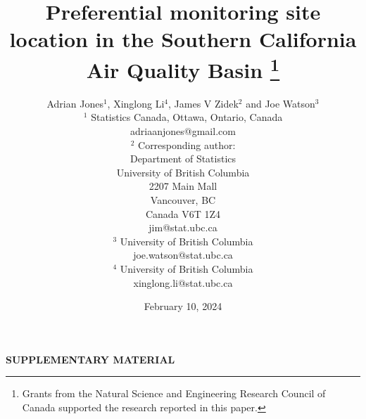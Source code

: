\documentclass{article}
\begin{document}
	
	\title{Preferential monitoring site location in the Southern California Air Quality Basin
		\thanks{
			Grants from the Natural Science and Engineering Research Council of Canada supported the research reported in this paper.} 
	}
	
	\date{February 10, 2024}
	
	\author{Adrian Jones$^1$, Xinglong Li$^4$, James V Zidek$^2$ and Joe Watson$^3$\\
		\small
		$^1$ Statistics Canada, Ottawa, Ontario, Canada \\\small
		adriaanjones@gmail.com\\\small
		$^2$ Corresponding author:\\\small
		Department of Statistics\\\small
		University of British Columbia \\\small
		2207 Main Mall\\\small
		Vancouver, BC \\\small
		Canada V6T 1Z4\\\small
		jim@stat.ubc.ca \\\small
		$^3$ University of British Columbia \\\small
		joe.watson@stat.ubc.ca \\\small
		$^4$ University of British Columbia \\\small
		xinglong.li@stat.ubc.ca \\\small
	}
	
	\maketitle
	
	
	
	
	
	
	
	
	

    \begin{center}
	    {\large\bf SUPPLEMENTARY MATERIAL}
    \end{center}
    



\end{document}
